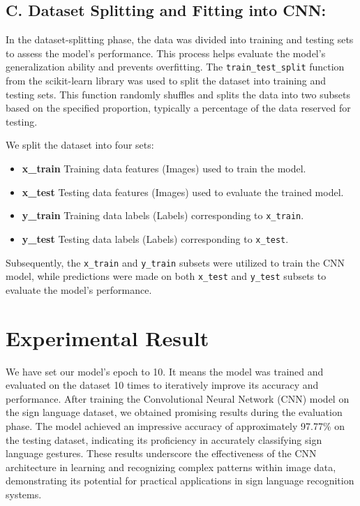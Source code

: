 \documentclass[conference]{IEEEtran}
\begin{document}
\vspace{\baselineskip}

\subsection{C. Dataset Splitting and Fitting into CNN:}

In the dataset-splitting phase, the data was divided into training and testing sets to assess the model's performance. This process helps evaluate the model's generalization ability and prevents overfitting.
The \texttt{train\_test\_split} function from the scikit-learn library was used to split the dataset into training and testing sets. This function randomly shuffles and splits the data into two subsets based on the specified proportion, typically a percentage of the data reserved for testing.

\vspace{\baselineskip}

We split the dataset into four sets:

\vspace{\baselineskip}

\begin{itemize}
    \item \textbf{x\_train} Training data features (Images) used to train the model.
    \item \textbf{x\_test} Testing data features (Images) used to evaluate the trained model.
    \item \textbf{y\_train} Training data labels (Labels) corresponding to \texttt{x\_train}.
    \item \textbf{y\_test} Testing data labels (Labels) corresponding to \texttt{x\_test}.
\end{itemize}

\vspace{\baselineskip}

Subsequently, the \texttt{x\_train} and \texttt{y\_train} subsets were utilized to train the CNN model, while predictions were made on both \texttt{x\_test} and \texttt{y\_test} subsets to evaluate the model's performance.

\section{Experimental Result}

\vspace{\baselineskip}

We have set our model’s epoch to 10. It means the model was trained and evaluated on the dataset 10 times to iteratively improve its accuracy and performance. After training the Convolutional Neural Network (CNN) model on the sign language dataset, we obtained promising results during the evaluation phase. The model achieved an impressive accuracy of approximately 97.77\% on the testing dataset, indicating its proficiency in accurately classifying sign language gestures. These results underscore the effectiveness of the CNN architecture in learning and recognizing complex patterns within image data, demonstrating its potential for practical applications in sign language recognition systems.
\end{document}
